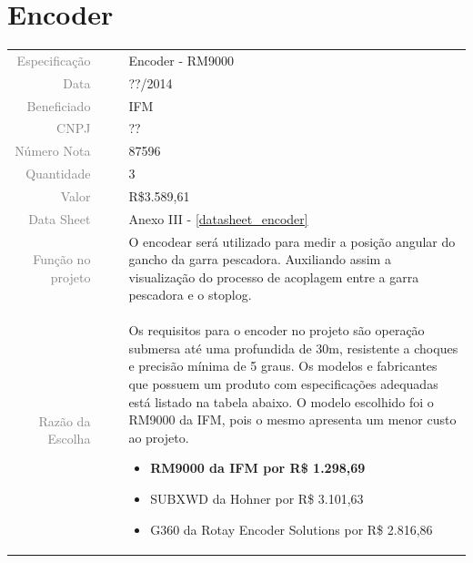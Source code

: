 

\section{Encoder}
\label{encoder}


\begin{table}[ht!]

	\begin{tabular}{r l|l p{12cm} }
		
		\textcolor{gray}{Especificação} &&& 	{Encoder - RM9000 }\\
		\textcolor{gray}{Data} &&& 				{??/2014}\\
        \textcolor{gray}{Beneficiado} &&&		{IFM} \\
        \textcolor{gray}{CNPJ} &&& 				{??} \\
        \textcolor{gray}{Número Nota} &&& 		{87596} \\
		\textcolor{gray}{Quantidade} &&& 		{3} \\
		\textcolor{gray}{Valor} &&& 			{R\$3.589,61} \\
		\textcolor{gray}{Data Sheet} &&& 		{Anexo III - \ref{datasheet_encoder} } \\

		\textcolor{gray}{Função no projeto} &&& {O encodear será utilizado para medir a posição angular do gancho da garra pescadora. Auxiliando assim a visualização do processo de acoplagem entre a garra pescadora e o stoplog.   } \\
		\textcolor{gray}{Razão da Escolha} &&& {Os requisitos para o encoder no projeto são operação submersa até uma profundida de 30m, resistente a choques e precisão mínima de 5 graus.  Os modelos e fabricantes que possuem um produto com especificações adequadas está listado na tabela abaixo. O modelo escolhido foi o RM9000 da IFM, pois o mesmo apresenta um menor custo ao projeto. 
		\begin{itemize}
		  \item \textbf{RM9000 da IFM por R\$ 1.298,69} 
		  \item SUBXWD da Hohner por R\$ 3.101,63
		  \item G360 da Rotay Encoder Solutions por R\$ 2.816,86
		\end{itemize}}
		

	\end{tabular}
\end{table}

\newpage

